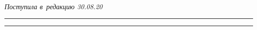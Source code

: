    


   


   \vspace*{-3pt}


   


   \hfill{\small\textit{Поступила в~редакцию 30.08.20}}


   


   


   


   


   \vspace*{6pt}


   


   \hrule


   


   \vspace*{2pt}


   




   




   


   \hrule


   


   \vspace*{8pt}


   


   \def\tit{FUZZY CONTROL OF~HETEROGENEOUS THINKING OF~THE~HYBRID 


INTELLIGENT MULTIAGENT SYSTEM'S AGENTS}


   


   \def\titkol{Fuzzy control of heterogeneous thinking of the hybrid intelligent 


multiagent system's agents}


   


\def\aut{S.\,V.~Listopad$^1$ and~S.\,B.~Rumovskaya$^{1,2}$}


   


\def\autkol{S.\,V.~Listopad and~S.\,B.~Rumovskaya}



